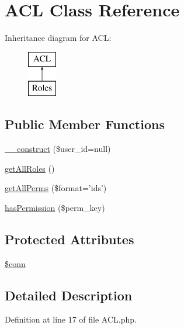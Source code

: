 \hypertarget{class_a_c_l}{\section{\-A\-C\-L \-Class \-Reference}
\label{class_a_c_l}
}
\-Inheritance diagram for \-A\-C\-L\-:\begin{figure}[H]
\begin{center}
\leavevmode
\includegraphics[height=2.000000cm]{class_a_c_l}
\end{center}
\end{figure}
\subsection*{\-Public \-Member \-Functions}
\begin{DoxyCompactItemize}
\item 
\hyperlink{class_a_c_l_abe4ccf83289d9605ef460f23e6d30b00}{\-\_\-\-\_\-construct} (\$user\-\_\-id=null)
\item 
\hyperlink{class_a_c_l_ad9d41efb9af8f1d2f8d9575069976da0}{get\-All\-Roles} ()
\item 
\hyperlink{class_a_c_l_a52a8e6475527958d575c898b47dab742}{get\-All\-Perms} (\$format='ids')
\item 
\hyperlink{class_a_c_l_a2ffd9cbc0e28be4d3fcda34fb2a2cd9f}{has\-Permission} (\$perm\-\_\-key)
\end{DoxyCompactItemize}
\subsection*{\-Protected \-Attributes}
\begin{DoxyCompactItemize}
\item 
\hyperlink{class_a_c_l_aa8a5a87b9c1a6a0819b88447cbe41877}{\$conn}
\end{DoxyCompactItemize}


\subsection{\-Detailed \-Description}


\-Definition at line 17 of file \-A\-C\-L.\-php.



